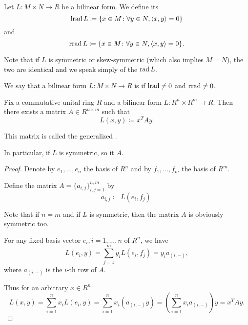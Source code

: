 \begin{definition}\label{def:bilinear_form_radicals}\cite[250]{Knapp2016BAlg}
  Let \( L: M \times N \to R \) be a bilinear form. We define its 
  \begin{equation*}
    \operatorname{lrad} L \coloneqq \{ x \in M \colon \forall y \in N, \left\langle x, y \right\rangle = 0 \}
  \end{equation*}
  and 
  \begin{equation*}
    \operatorname{rrad} L \coloneqq \{ x \in M \colon \forall y \in N, \left\langle x, y \right\rangle = 0 \}.
  \end{equation*}

  Note that if \( L \) is symmetric or skew-symmetric (which also implies \( M = N \)), the two are identical and we speak simply of the  \( \operatorname{rad} L \).
\end{definition}

\begin{definition}\label{def:nondegenerate_bilinear_form}\cite[249]{Knapp2016BAlg}
  We say that a bilinear form \( L: M \times N \to R \) is  if \( \operatorname{lrad} \neq 0 \) and \( \operatorname{rrad} \neq 0 \).
\end{definition}

\begin{theorem}\label{thm:bilinear_form_matrix_presentation}
  Fix a commutative unital ring \( R \) and a bilinear form \( L: R^n \times R^m \to R \). Then there exists a matrix \( A \in R^{n \times m} \) such that
  \begin{equation*}
    L(x, y) \coloneqq x^T A y.
  \end{equation*}

  This matrix is called the generalized .

  In particular, if \( L \) is symmetric, so it \( A \).
\end{theorem}
\begin{proof}
  Denote by \( e_1, \ldots, e_n \) the basis of \( R^n \) and by \( f_1, \ldots, f_m \) the basis of \( R^m \).

  Define the matrix \( A = \{ a_{i,j} \}_{i,j=1}^{n,m} \) by
  \begin{equation*}
    a_{i,j} \coloneqq L(e_i, f_j).
  \end{equation*}

  Note that if \( n = m \) and if \( L \) is symmetric, then the matrix \( A \) is obviously symmetric too.

  For any fixed basis vector \( e_i, i = 1, \ldots, n \) of \( R^n \), we have
  \begin{equation*}
    L(e_i, y)
    =
    \sum_{j=1}^m y_i L(e_i, f_j)
    =
    y_i a_{(i,-)},
  \end{equation*}
  where \( a_{(i,-)} \) is the \( i \)-th row of \( A \).

  Thus for an arbitrary \( x \in R^n \)
  \begin{equation*}
    L(x, y)
    =
    \sum_{i=1}^n x_i L(e_i, y)
    =
    \sum_{i=1}^n x_i (a_{(i,-)} y)
    =
    \left( \sum_{i=1}^n x_i a_{(i,-)} \right) y
    =
    x^T A y.
  \end{equation*}
\end{proof}

